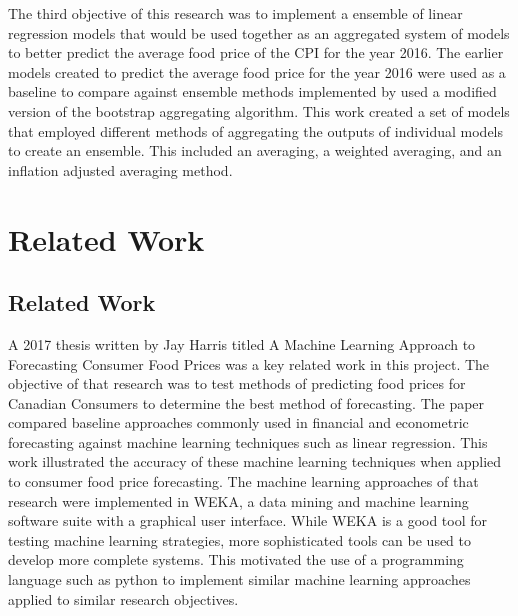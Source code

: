 \documentclass[12pt]{dalthesis}
\begin{document}
The third objective of this research was to implement a ensemble of linear regression models that would be used together as an aggregated system of models to better predict the average food price of the CPI for the year 2016. The earlier models created to predict the average food price for the year 2016 were used as a baseline to compare against ensemble methods implemented by used a modified version of the bootstrap aggregating algorithm. This work created a set of models that employed different methods of aggregating the outputs of  individual models to create an ensemble. This included an averaging, a weighted averaging, and an inflation adjusted averaging method. \\

\chapter{Related Work}
\section{Related Work}

A 2017 thesis written by Jay Harris titled A Machine Learning Approach to Forecasting Consumer Food Prices was a key related work in this project. The objective of that research was to test methods of predicting food prices for Canadian Consumers to determine the best method of forecasting. The paper compared baseline approaches commonly used in financial and econometric forecasting against machine learning techniques such as linear regression. This work illustrated the accuracy of these machine learning techniques when applied to consumer food price forecasting. \cite{jay} The machine learning approaches of that research were implemented in WEKA, a data mining and machine learning software suite with a graphical user interface. While WEKA is a good tool for testing machine learning strategies, more sophisticated tools can be used to develop more complete systems. \cite{jay} This motivated the use of a programming language such as python to implement similar machine learning approaches applied to similar research objectives. \\
\end{document}
